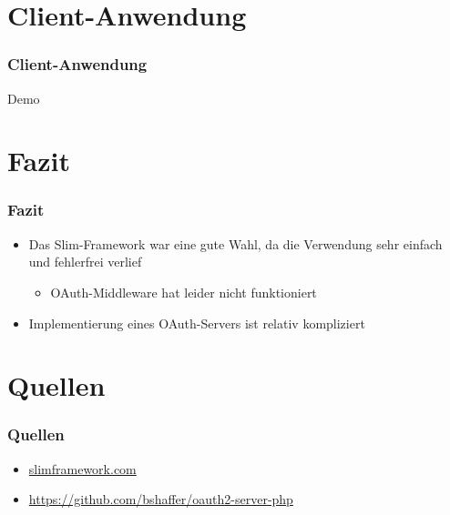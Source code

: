 \section{Client-Anwendung}
\begin{frame}
	\frametitle*{Client-Anwendung}
	Demo
\end{frame}

\section{Fazit}
\begin{frame}
	\frametitle*{Fazit}
	\begin{itemize}
		\item Das Slim-Framework war eine gute Wahl, da die Verwendung sehr einfach und fehlerfrei verlief
		\begin{itemize}
			\item OAuth-Middleware hat leider nicht funktioniert
		\end{itemize}
	\item Implementierung eines OAuth-Servers ist relativ kompliziert
	\end{itemize}
\end{frame}


\section{Quellen}
\begin{frame}
	\frametitle*{Quellen}
	\begin{itemize}
		\item \url{slimframework.com}
		\item \url{https://github.com/bshaffer/oauth2-server-php}
	\end{itemize}
\end{frame}
